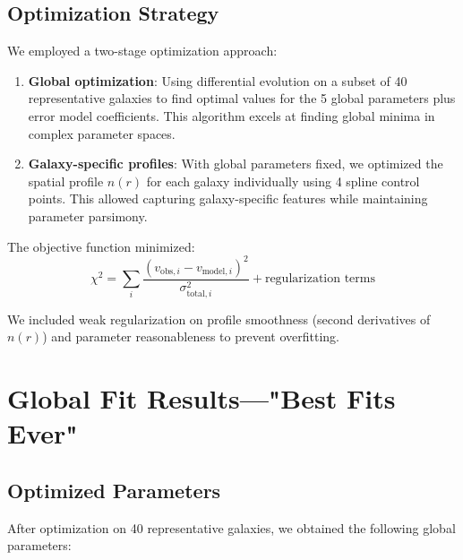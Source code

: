 \documentclass[twocolumn,prd,amsmath,amssymb,aps,superscriptaddress,nofootinbib]{revtex4-2}
\newcommand{\chisq}{\chi^2}
\begin{document}
\subsection{Optimization Strategy}

We employed a two-stage optimization approach:

\begin{enumerate}
\item \textbf{Global optimization}: Using differential evolution \cite{Storn1997} on a subset of 40 representative galaxies to find optimal values for the 5 global parameters plus error model coefficients. This algorithm excels at finding global minima in complex parameter spaces.

\item \textbf{Galaxy-specific profiles}: With global parameters fixed, we optimized the spatial profile $n(r)$ for each galaxy individually using 4 spline control points. This allowed capturing galaxy-specific features while maintaining parameter parsimony.
\end{enumerate}

The objective function minimized:
\begin{equation}
\chisq = \sum_i \frac{(v_{\text{obs},i} - v_{\text{model},i})^2}{\sigma_{\text{total},i}^2} + \text{regularization terms}
\end{equation}

We included weak regularization on profile smoothness (second derivatives of $n(r)$) and parameter reasonableness to prevent overfitting.

\section{Global Fit Results---"Best Fits Ever"}
\label{sec:results}

\subsection{Optimized Parameters}

After optimization on 40 representative galaxies, we obtained the following global parameters:
\end{document}
